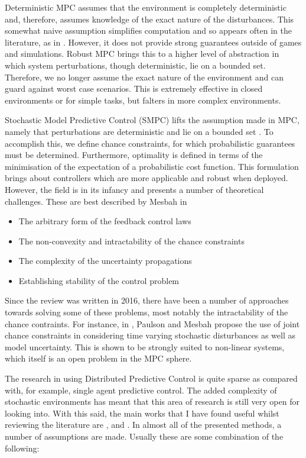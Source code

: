\documentclass[preprint,11pt]{report}
\begin{document}
Deterministic MPC assumes that the environment is completely deterministic and, therefore, assumes
knowledge of the exact nature of the disturbances. This somewhat naive assumption simplifies
computation and so appears often in the literature, as in \cite{Rosolia2018}. However, it does not
provide strong guarantees outside of games and simulations. Robust MPC brings this to a higher level
of abstraction in which system perturbations, though deterministic, lie on a bounded set. Therefore,
we no longer assume the exact nature of the environment and can guard against worst case scenarios.
This is extremely effective in closed environments or for simple tasks, but falters in more complex
environments.

Stochastic Model Predictive Control (SMPC) lifts the assumption made in MPC, namely that
perturbations are deterministic and lie on a bounded set \cite{Mesbah2016}. To accomplish this, we
define chance constraints, for which probabilistic guarantees must be determined. Furthermore,
optimality is defined in terms of the minimisation of the expectation of a probabilistic
cost function. This formulation brings about controllers which are more applicable and robust when
deployed. However, the field is in its infancy and presents a number of theoretical challenges.
These are best described by Mesbah in \cite{Mesbah2016}

\begin{itemize}
	\item The arbitrary form of the feedback control laws
	\item The non-convexity and intractability of the chance constraints
	\item The complexity of the uncertainty propagations
	\item Establishing stability of the control problem
\end{itemize}

Since the review \cite{Mesbah2016} was written in 2016, there have been a number of approaches towards solving
some of
these problems, most notably the intractability of the chance contraints. For instance, in 
\cite{Paulson2019}, Paulson and Mesbah propose the use of joint chance constraints in considering
time varying stochastic disturbances as well as model uncertainty. This is shown to be strongly
suited to non-linear systems, which itself is an open problem in the MPC sphere.


The research in using Distributed Predictive Control is quite sparse as compared with, for example,
single agent predictive control. The added complexity of stochastic environments has meant that this
area of research is still very open for looking into. With this said, the main works that I have
found useful whilst reviewing the literature are \cite{Conte2014}, \cite{Christofides2013} and 
\cite{Giulioni2015}. In almost all of the presented methods, a number of assumptions are made.
Usually these are some combination of the following:
\end{document}

